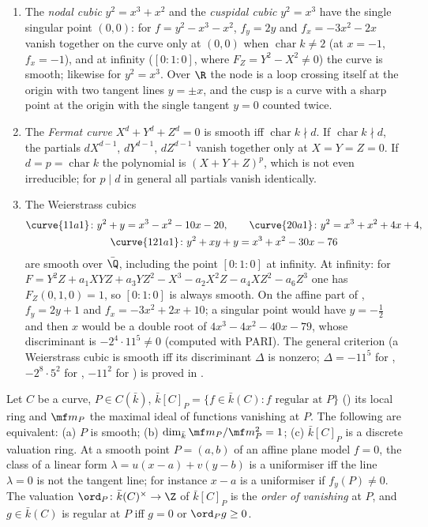 \begin{example}\label{ex:curves:plane-examples}
\leavevmode
\begin{enumerate}[label=(\alph*)]
\item The \emph{nodal cubic} $y^2=x^3+x^2$ and the \emph{cuspidal cubic} $y^2=x^3$ have the single singular point $(0,0)$: for $f=y^2-x^3-x^2$,
$f_y=2y$ and $f_x=-3x^2-2x$ vanish together on the curve only at $(0,0)$ when $\operatorname{char}k\ne2$ (at $x=-1$, $f_x=-1$), and at infinity ($[0:1:0]$, where
$F_Z=Y^2-X^2\ne0$) the curve is smooth; likewise for $y^2=x^3$. Over $\R$ the node is a loop crossing itself at the origin with two
tangent lines $y=\pm x$, and the cusp is a curve with a sharp point at the origin with the single tangent $y=0$ counted twice.
\item The \emph{Fermat curve} $X^d+Y^d+Z^d=0$ is smooth iff $\operatorname{char}k\nmid d$. If $\operatorname{char}k\nmid d$, the partials $dX^{d-1}$, $dY^{d-1}$, $dZ^{d-1}$ vanish
together only at $X=Y=Z=0$. If $d=p=\operatorname{char}k$ the polynomial is $(X+Y+Z)^p$, which is not even irreducible; for $p\mid d$ in general all
partials vanish identically.
\item The Weierstrass cubics
\begin{gather*}
\curve{11a1}\colon y^2+y=x^3-x^2-10x-20,\qquad \curve{20a1}\colon y^2=x^3+x^2+4x+4,\\
\curve{121a1}\colon y^2+xy+y=x^3+x^2-30x-76
\end{gather*}
are smooth over $\bar\Q$, including the point $[0:1:0]$ at infinity. At infinity: for $F=Y^2Z+a_1XYZ+a_3YZ^2-X^3-a_2X^2Z-a_4XZ^2-a_6Z^3$ one has
$F_Z(0,1,0)=1$, so $[0:1:0]$ is always smooth. On the affine part of , $f_y=2y+1$ and $f_x=-3x^2+2x+10$; a singular point would have
$y=-\frac12$ and then $x$ would be a double root of $4x^3-4x^2-40x-79$, whose discriminant is $-2^4\cdot11^5\ne0$ (computed with PARI). The general
criterion (a Weierstrass cubic is smooth iff its discriminant $\Delta$ is nonzero; $\Delta=-11^5$ for , $-2^8\cdot5^2$ for ,
$-11^2$ for ) is proved in .
\end{enumerate}
\end{example}

\begin{theorem}\label{thm:curves:smooth-dvr}
Let $C$ be a curve, $P\in C(\bar k)$, $\bar k[C]_P=\{f\in\bar k(C):f\text{ regular at }P\}$ () its local ring and $\mf m_P$ the maximal ideal of
functions vanishing at $P$. The following are equivalent: (a) $P$ is smooth; (b) $\dim_{\bar k}\mf m_P/\mf m_P^2=1$; (c) $\bar k[C]_P$ is a discrete
valuation ring. At a smooth point $P=(a,b)$ of an affine plane model $f=0$, the class of a linear form $\lambda=u(x-a)+v(y-b)$ is a uniformiser iff the
line $\lambda=0$ is not the tangent line; for instance $x-a$ is a uniformiser if $f_y(P)\ne0$. The valuation $\ord_P\colon\bar k(C)^\times\to\Z$ of $\bar k[C]_P$
is the \emph{order of vanishing} at $P$, and $g\in\bar k(C)$ is regular at $P$ iff $g=0$ or $\ord_Pg\ge0$.
\end{theorem}

